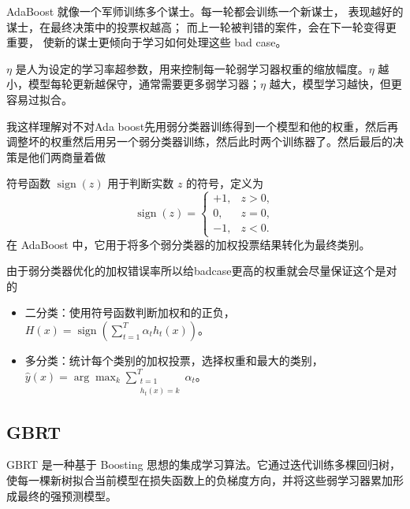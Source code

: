 \begin{dxtips}
    AdaBoost 就像一个军师训练多个谋士。每一轮都会训练一个新谋士，
表现越好的谋士，在最终决策中的投票权越高；
而上一轮被判错的案件，会在下一轮变得更重要，
使新的谋士更倾向于学习如何处理这些 bad case。
\end{dxtips}
\begin{note}
$\eta$ 是人为设定的学习率超参数，用来控制每一轮弱学习器权重的缩放幅度。$\eta$ 越小，模型每轮更新越保守，通常需要更多弱学习器；$\eta$ 越大，模型学习越快，但更容易过拟合。
\end{note}
\begin{dxtips}
    我这样理解对不对Ada boost先用弱分类器训练得到一个模型和他的权重，然后再调整坏的权重然后用另一个弱分类器训练，然后此时两个训练器了。然后最后的决策是他们两商量着做
\end{dxtips}

\begin{definition}[符号函数]
符号函数 $\operatorname{sign}(z)$ 用于判断实数 $z$ 的符号，定义为
\[
\operatorname{sign}(z)
=
\begin{cases}
+1, & z>0,\\
0, & z=0,\\
-1, & z<0.
\end{cases}
\]
在 AdaBoost 中，它用于将多个弱分类器的加权投票结果转化为最终类别。
\end{definition}

\begin{dxtips}
    由于弱分类器优化的加权错误率所以给badcase更高的权重就会尽量保证这个是对的
    
\end{dxtips}
\begin{itemize}
    \item 二分类：使用符号函数判断加权和的正负，$H(x)=\operatorname{sign}\left(\sum_{t=1}^{T}\alpha_t h_t(x)\right)$。
    \item 多分类：统计每个类别的加权投票，选择权重和最大的类别，$\hat{y}(x)=\arg\max_{k}\sum_{\substack{t=1\\ h_t(x)=k}}^{T}\alpha_t$。
\end{itemize}
\subsection{GBRT}
\begin{definition}
GBRT 是一种基于 Boosting 思想的集成学习算法。它通过迭代训练多棵回归树，使每一棵新树拟合当前模型在损失函数上的负梯度方向，并将这些弱学习器累加形成最终的强预测模型。
\end{definition}

